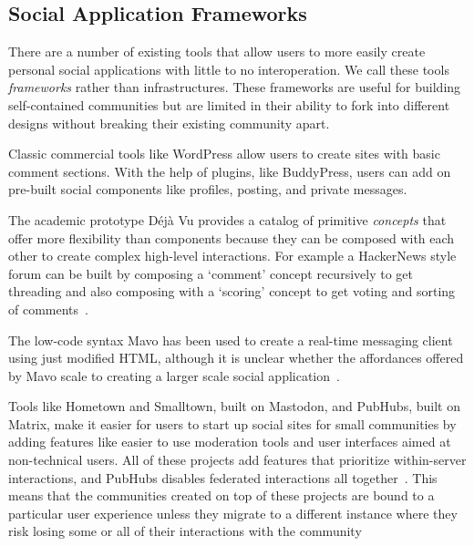 \subsection{Social Application Frameworks}

There are a number of existing tools that allow users to more easily create personal social applications with little to no interoperation.
We call these tools \emph{frameworks} rather than infrastructures.
These frameworks are useful for building self-contained communities but are limited in their ability to fork into different designs without breaking their existing community apart.

Classic commercial tools like WordPress allow users to create sites with basic comment sections. With the help of plugins, like BuddyPress, users can add on pre-built social components like profiles, posting, and private messages.

The academic prototype Déjà Vu provides a catalog of primitive \emph{concepts} that offer more flexibility than components because they can be composed with each other to create complex high-level interactions. For example a HackerNews style forum can be built by composing a `comment' concept recursively to get threading and also composing with a `scoring' concept to get voting and sorting of comments~\cite{dejavu}.

The low-code syntax Mavo has been used to create a real-time messaging client using just modified HTML, although it is unclear whether the affordances offered by Mavo scale to creating a larger scale social application~\cite{mavo,mavochat}.

Tools like Hometown and Smalltown, built on Mastodon, and PubHubs, built on Matrix, make it easier for users to start up social sites for small communities by adding features like easier to use moderation tools and user interfaces aimed at non-technical users.
All of these projects add features that prioritize within-server interactions, and PubHubs disables federated interactions all together~\cite{smalltown,runyourownsocial,pubhubs,pubhubsidentity}.
This means that the communities created on top of these projects are bound to a particular user experience unless they migrate to a different instance where they risk losing some or all of their interactions with the community

